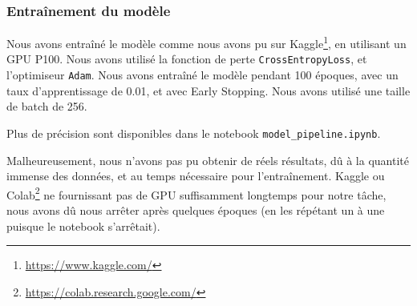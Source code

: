 \subsubsection{Entraînement du modèle}
\label{subsubsec:train}
Nous avons entraîné le modèle comme nous avons pu sur Kaggle\footnote{\url{https://www.kaggle.com/}}, en utilisant un GPU P100. Nous avons utilisé la fonction de perte \texttt{CrossEntropyLoss}, et l'optimiseur \texttt{Adam}. Nous avons entraîné le modèle pendant 100 époques, avec un taux d'apprentissage de 0.01, et avec Early Stopping. Nous avons utilisé une taille de batch de 256.

Plus de précision sont disponibles dans le notebook \texttt{model\_pipeline.ipynb}.

Malheureusement, nous n'avons pas pu obtenir de réels résultats, dû à la quantité immense des données, et au temps nécessaire pour l'entraînement. Kaggle ou Colab\footnote{\url{https://colab.research.google.com/}} ne fournissant pas de GPU suffisamment longtemps pour notre tâche, nous avons dû nous arrêter après quelques époques (en les répétant un à une puisque le notebook s'arrêtait).